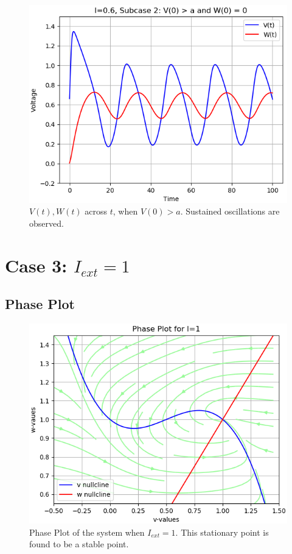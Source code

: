 \documentclass[12pt,a4paper]{article}
\begin{document}
	\begin{figure}[H]
	\centering
	\includegraphics[scale=0.6]{images/Figure_8.png}
	\caption{$V(t), W(t)$ across $t$, when $V(0)>a$. Sustained oscillations are observed.}
	\end{figure}

\section{Case 3: $I_{ext}=1$}
\subsection{Phase Plot}
	\begin{figure}[H]
	\centering
	\includegraphics[scale=0.6]{images/Figure_9.png}
	\caption{Phase Plot of the system when $I_{ext} =  1$. This stationary point is found to be a stable point.}
	\end{figure}
\end{document}
